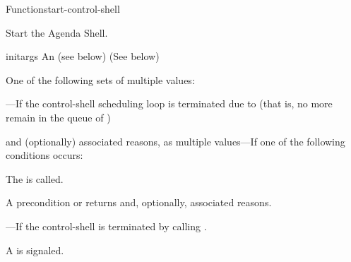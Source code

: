 \documentclass[10pt,twoside,english,pdftex]{article}
\begin{document}
\begin{functiondoc}{Function}{start-control-shell}%
  { 
    \returns{} \superstar}
%
%
%
%

\fnsyntax

\fnpurpose Start the Agenda Shell.

\fnpackage {}

\fnmodule {}

\fnargs
\begin{args}{initargs}
\arg[initargs] An  (see below)
\arg[results] (See below)
\end{args}

\fnreturns
One of the following sets of multiple values: 

\begin{tightitemize}
\item {}---If the control-shell scheduling loop is terminated
  due to  (that is, no more  remain
  in the queue of )
\item {} and (optionally) associated reasons, as multiple
  values---If one of the following conditions occurs:
\begin{tightitemize}
\item The \textbf{}  is
  called.
\item A precondition  or  
  returns  and, optionally, associated reasons.
\end{tightitemize}
\item {}---If the control-shell is terminated by
  calling \textbf{}.
\end{tightitemize}

\fnevents
{}%
%
%
%
%
%
A  is signaled.
 
\fnerrors
\threadsnotstarted


\end{functiondoc}
\end{document}
